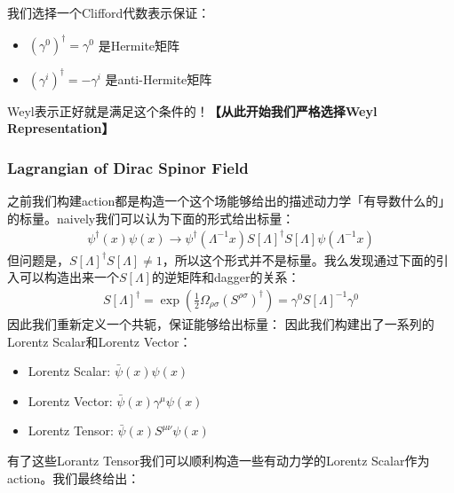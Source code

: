 我们选择一个Clifford代数表示保证：
\begin{itemize}
  \item $(\gamma^0)^\dagger = \gamma^0$ 是Hermite矩阵
    \item $(\gamma^i)^\dagger = -\gamma^i$ 是anti-Hermite矩阵
\end{itemize}
Weyl表示正好就是满足这个条件的！\textbf{【从此开始我们严格选择Weyl Representation】}


\subsubsection{Lagrangian of Dirac Spinor Field}


之前我们构建action都是构造一个这个场能够给出的描述动力学「有导数什么的」的标量。naively我们可以认为下面的形式给出标量：
\begin{align}
  \psi^\dagger(x)\psi(x)\to\psi^\dagger(\Lambda^{-1}x)S[\Lambda]^\dagger S[\Lambda]\psi(\Lambda^{-1}x)
\end{align}
但问题是，$ S[\Lambda]^\dagger S[\Lambda]\neq 1 $，所以这个形式并不是标量。我么发现通过下面的引入可以构造出来一个$ S[\Lambda] $的逆矩阵和dagger的关系：
\begin{align}
  S[\Lambda]^{\dagger}=\exp\left(\frac{1}{2}\Omega_{\rho\sigma}(S^{\rho\sigma})^{\dagger}\right)=\gamma^0S[\Lambda]^{-1}\gamma^0
\end{align}
因此我们重新定义一个共轭，保证能够给出标量：
因此我们构建出了一系列的Lorentz Scalar和Lorentz Vector：
\begin{itemize}
  \item Lorentz Scalar: $\bar{\psi}(x)\psi(x)$
  \item Lorentz Vector: $\bar{\psi}(x)\gamma^\mu\psi(x)$ 
  \item Lorentz Tensor: $\bar{\psi}(x)S^{\mu\nu}\psi(x)$
\end{itemize}


\bigskip
{}

有了这些Lorantz Tensor我们可以顺利构造一些有动力学的Lorentz Scalar作为action。我们最终给出：


